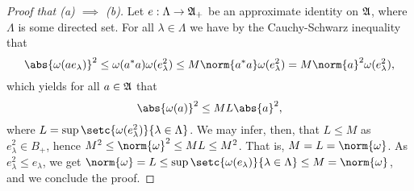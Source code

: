 \begin{proof}[Proof that (a) \(\implies\) (b)]
    Let \(e : \Lambda \to \mathfrak{A}_+\) be an approximate identity on \(\mathfrak{A}\), where \(\Lambda\) is some directed set. For all \(\lambda \in \Lambda\) we have by the Cauchy-Schwarz inequality that
    \begin{equation*}
        \abs{\omega(a e_\lambda)}^2 \leq \omega(a^*a) \omega(e_\lambda^2) \leq M \norm{a^*a} \omega(e_{\lambda}^2) = M \norm{a}^2\omega(e_\lambda^2),
    \end{equation*}
    which yields for all \(a \in \mathfrak{A}\) that
    \begin{equation*}
        \abs{\omega(a)}^2 \leq M L \abs{a}^2,
    \end{equation*}
    where \(L = \sup\setc{\omega(e_\lambda^2)}{\lambda \in \Lambda}\). We may infer, then, that \(L \leq M\) as \(e_{\lambda}^2 \in B_+\), hence \(M^2 \leq \norm{\omega}^2 \leq ML \leq M^2\). That is, \(M = L = \norm{\omega}\). As \(e_\lambda^2 \leq e_\lambda\), we get \(\norm{\omega} = L \leq \sup\setc{\omega(e_\lambda)}{\lambda \in \Lambda} \leq M = \norm{\omega}\), and we conclude the proof.
\end{proof}
